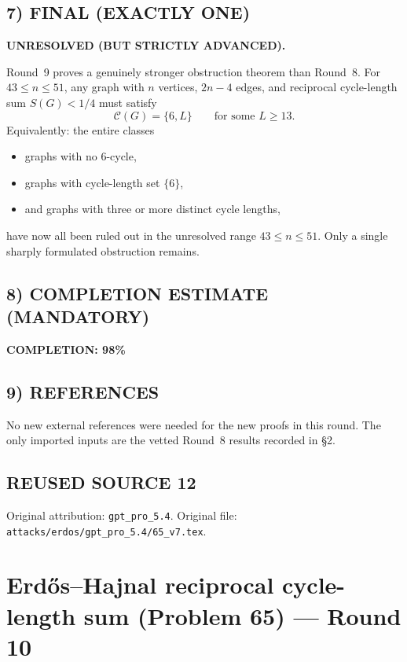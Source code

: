 \subsection*{7) FINAL (EXACTLY ONE)}

\textbf{UNRESOLVED (BUT STRICTLY ADVANCED).}

Round~9 proves a genuinely stronger obstruction theorem than Round~8.
For $43\le n\le 51$, any graph with $n$ vertices, $2n-4$ edges, and reciprocal cycle-length sum $S(G)<1/4$ must satisfy
\[
\mathcal C(G)=\{6,L\}
\qquad\text{for some }L\ge 13.
\]
Equivalently: the entire classes
\begin{itemize}
\item graphs with no $6$-cycle,
\item graphs with cycle-length set $\{6\}$,
\item and graphs with three or more distinct cycle lengths,
\end{itemize}
have now all been ruled out in the unresolved range $43\le n\le 51$.
Only a single sharply formulated obstruction remains.

\subsection*{8) COMPLETION ESTIMATE (MANDATORY)}

\textbf{COMPLETION: 98\%}

\subsection*{9) REFERENCES}

No new external references were needed for the new proofs in this round.
The only imported inputs are the vetted Round~8 results recorded in \S2.


\subsection*{REUSED SOURCE 12}
Original attribution: \texttt{gpt\_pro\_5.4}.
Original file: \texttt{attacks/erdos/gpt\_pro\_5.4/65\_v7.tex}.

\section{Erd\H{o}s--Hajnal reciprocal cycle-length sum (Problem 65) --- Round 10}

